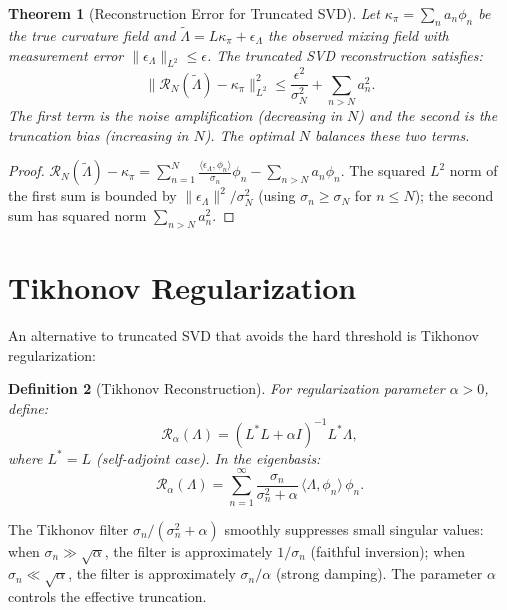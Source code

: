 \documentclass[12pt, oneside]{book}
\theoremstyle{plain-flyxion}
\newtheorem{theorem}{Theorem}[chapter]
\theoremstyle{definition-flyxion}
\newtheorem{definition}[theorem]{Definition}
\newcommand{\kpi}{\kappa_{\pi}}
\newcommand{\Lam}{\Lambda}
\begin{document}
\begin{theorem}[Reconstruction Error for Truncated SVD]\label{thm:tsvd-error}
Let $\kpi = \sum_n a_n\phi_n$ be the true curvature field and $\tilde\Lam = L\kpi +
\epsilon_\Lam$ the observed mixing field with measurement error $\|\epsilon_\Lam\|_{L^2}
\leq \epsilon$. The truncated SVD reconstruction satisfies:
\begin{equation}\label{eq:tsvd-error}
\|\mathcal{R}_N(\tilde\Lam) - \kpi\|_{L^2}^2
\leq \frac{\epsilon^2}{\sigma_N^2} + \sum_{n > N} a_n^2.
\end{equation}
The first term is the \emph{noise amplification} (decreasing in $N$) and the second is
the \emph{truncation bias} (increasing in $N$). The optimal $N$ balances these two terms.
\end{theorem}

\begin{proof}
$\mathcal{R}_N(\tilde\Lam) - \kpi = \sum_{n=1}^N \frac{\langle\epsilon_\Lam,\phi_n\rangle}
{\sigma_n}\phi_n - \sum_{n>N} a_n\phi_n$.
The squared $L^2$ norm of the first sum is bounded by $\|\epsilon_\Lam\|^2/\sigma_N^2$
(using $\sigma_n \geq \sigma_N$ for $n \leq N$); the second sum has squared norm
$\sum_{n>N}a_n^2$.
\end{proof}

\section{Tikhonov Regularization}

An alternative to truncated SVD that avoids the hard threshold is Tikhonov
regularization:

\begin{definition}[Tikhonov Reconstruction]\label{def:tikhonov}
For regularization parameter $\alpha > 0$, define:
\begin{equation}\label{eq:tikhonov}
\mathcal{R}_\alpha(\Lam) = (L^* L + \alpha I)^{-1} L^* \Lam,
\end{equation}
where $L^* = L$ (self-adjoint case). In the eigenbasis:
\[
\mathcal{R}_\alpha(\Lam) = \sum_{n=1}^\infty \frac{\sigma_n}{\sigma_n^2 + \alpha}\,
\langle\Lam, \phi_n\rangle\, \phi_n.
\]
\end{definition}

The Tikhonov filter $\sigma_n/(\sigma_n^2 + \alpha)$ smoothly suppresses small singular
values: when $\sigma_n \gg \sqrt{\alpha}$, the filter is approximately $1/\sigma_n$
(faithful inversion); when $\sigma_n \ll \sqrt{\alpha}$, the filter is approximately
$\sigma_n/\alpha$ (strong damping). The parameter $\alpha$ controls the effective
truncation.
\end{document}
